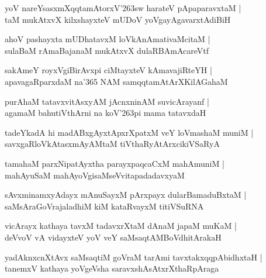 \documentclass[twoside,12pt,openright]{book}
\def\S{\char'263}
\newcounter{shloka}[chapter]
\begin{document}
\begin{shloka}%
yoV nareYsasxmXqqtamAtorxV\S sw harateV pApaparavxtaM |\\
taM mukAtxvX kilxshayxteV mUDoV yoVgayAgavarxtAdiBiH
\end{shloka}

\begin{shloka}%
 ahoV pashayxta mUDhatavxM loVkAnAmativaMcitaM |\\
sulaBaM rAmaBajanaM mukAtxvX dulaRBAmAcareVtf 
\end{shloka}

\begin{shloka}%
sakAmeY royxVgiBirAvxpi ciMtayxteV kAmavajiRteYH |\\
apavagaRparxdaM na\char'365 NAM samqqtamAtArXKilAGahaM
\end{shloka}

\begin{shloka}%
 purAhaM tatavxvitAsxyAM jAcnxninAM suvicArayanf |\\
agamaM bahutiVthArni na koV\S pi mama tatavxdaH 
\end{shloka}

\begin{shloka}%
tadeYkadA hi madABxgAyxtApxrXpatxM veY loVmashaM muniM |\\
savxgaRloVkAtasxmAyAMtaM tiVthaRyAtArxcikiVSaRyA 
\end{shloka}

\begin{shloka}%
tamahaM parxNipatAyxtha parayxpaqcaCxM mahAmuniM |\\
mahAyuSaM mahAyoVgisaMseVvitapadadavxyaM
\end{shloka}

\begin{shloka}%
sAvxminamxyAdayx mAnuSayxM pArxpayx dularBamaduBxtaM |\\
saMsAraGoVrajaladhiM kiM kataRvayxM titiVSuRNA
\end{shloka}

\begin{shloka}%
vicArayx kathaya tavxM tadavxrXtaM dAnaM japaM muKaM |\\
deVvoV vA vidayxteV yoV veY saMsaqtAMBoVdhitArakaH 
\end{shloka}

\begin{shloka}%
yadAknxcnXtAvx saMsaqtiM goVraM tarAmi tavxtakxqqpAbidhxtaH |\\
tanemxV kathaya yoVgeVsha saravxshAsAtxrXthaRpAraga
\end{shloka}
\end{document}
